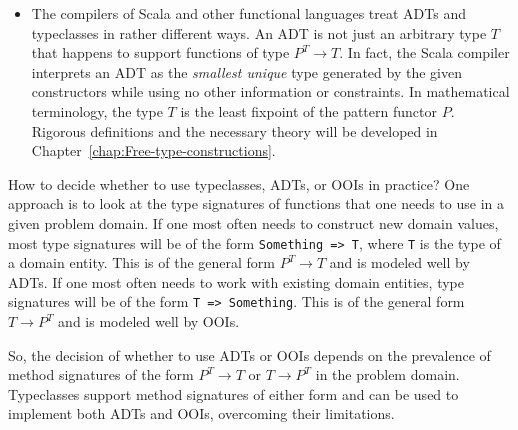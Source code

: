 \begin{itemize}
by the compiler (with no boilerplate code) for a wide range of user-defined
types. But there are no comparable facilities for object-oriented
\textsf{``}interface derivation\textsf{''}. 
\item The compilers of Scala and other functional languages treat ADTs and
typeclasses in rather different ways. An ADT is not just an arbitrary
type $T$ that happens to support functions of type $P^{T}\rightarrow T$.
In fact, the Scala compiler interprets an ADT as the \emph{smallest
unique} type generated by the given constructors while using no other
information or constraints. In mathematical terminology, the type
$T$ is the least fixpoint of the pattern functor
$P$. Rigorous definitions and the necessary theory will be developed
in Chapter~\ref{chap:Free-type-constructions}.
\end{itemize}
How to decide whether to use typeclasses, ADTs, or OOIs in practice?
One approach is to look at the type signatures of functions that one
needs to use in a given problem domain. If one most often needs to
construct new domain values, most type signatures will be of the form
\lstinline!Something => T!, where \lstinline!T! is the type of a
domain entity. This is of the general form $P^{T}\rightarrow T$ and
is modeled well by ADTs. If one most often needs to work with existing
domain entities, type signatures will be of the form \lstinline!T => Something!.
This is of the general form $T\rightarrow P^{T}$ and is modeled well
by OOIs. 

So, the decision of whether to use ADTs or OOIs depends on the prevalence
of method signatures of the form $P^{T}\rightarrow T$ or $T\rightarrow P^{T}$
in the problem domain. Typeclasses support method signatures of either
form and can be used to implement both ADTs and OOIs, overcoming their
limitations.

